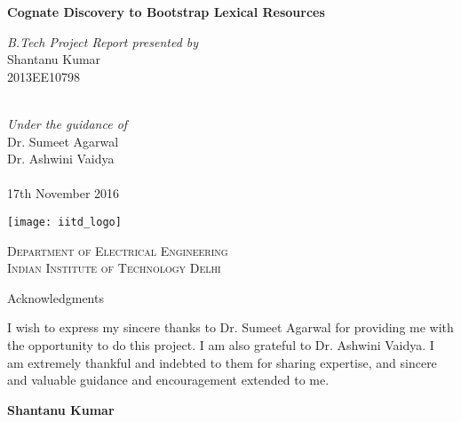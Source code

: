 \begin{titlepage}
\begin{center}

\LARGE{\textsf{\bf Cognate Discovery to Bootstrap Lexical Resources }}\\

\vspace{100pt}

{\normalsize \emph{B.Tech Project Report presented by}} \\
\vspace{10pt}
\Large{{Shantanu Kumar}} \\
{\large 2013EE10798}

\ \\
{\normalsize \emph {Under the guidance of}} \\
\vspace{10pt}
\Large{{ Dr. Sumeet Agarwal}} \\
\vspace{10pt}
\Large{{ Dr. Ashwini Vaidya}} \\


\ \\
\vspace{30pt}
\large{17th November 2016}

\vspace{10pt}
\texttt{[image: iitd\_logo]} \\
\vspace{10pt}

\large{\textsc{Department of Electrical Engineering\\
Indian Institute of Technology Delhi}}

\end{center}
\end{titlepage}

\begin{center}
\LARGE{Acknowledgments} 
\end{center}

\vspace{0.5in}

I wish to express my sincere thanks to Dr. Sumeet Agarwal for providing me with the opportunity to do this project. I am also grateful to Dr. Ashwini Vaidya. I am extremely thankful and indebted to them for sharing expertise, and sincere and valuable guidance and encouragement extended to me.

\vspace{1.5in}

{\bf Shantanu Kumar}

